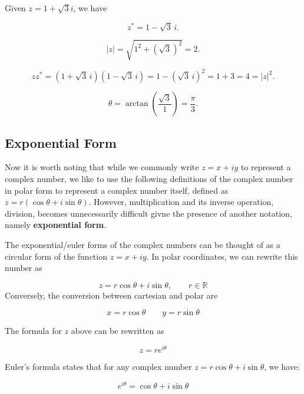 \documentclass[12pt]{article}
\begin{document}
\begin{example}
    Given $z = 1 + \sqrt{3}i$, we have

    $$z^* = 1-\sqrt{3}\,i.$$

    $$|z|=\sqrt{1^2+(\sqrt{3})^2}=2.$$

    $$zz^*=(1+\sqrt{3}\,i)(1-\sqrt{3}\,i)=1-(\sqrt{3}\,i)^2=1+3=4=|z|^2.$$

    $$\theta=\arctan\!\left(\dfrac{\sqrt{3}}{1}\right)=\dfrac{\pi}{3}.$$

\end{example}


\subsection{Exponential Form}

Now it is worth noting that while we commonly write $z = x + iy$ to represent a complex number, we like to use the following definitions of the complex number in polar form to represent a complex number itself, defined as $z = r (\cos \theta + i \sin \theta)$. However, multiplication and its inverse operation, division, becomes unnecessarily difficult givne the presence of another notation, namely \textbf{exponential form}. 


\begin{definition}
    The exponential/euler forms of the complex numbers can be thought of as a circular form of the function $z = x + iy$. In polar coordinates, we can rewrite this number as 

    $$
        z = r \cos \theta + i \sin \theta, \qquad r \in \mathbb{R}
    $$
    Conversely, the conversion between cartesian and polar are 
    
    $$
    x = r \cos \theta \qquad y = r \sin \theta
    $$
    
    The formula for $z$ above can be rewritten as 

    $$z = r e^{i\theta}$$
\end{definition}


\begin{theorem}
    Euler's formula states that for any complex number $z = r \cos \theta + i \sin \theta$, we have:

    $$
    e^{i \theta} = \cos \theta + i \sin \theta
    $$
\end{theorem}
\end{document}
